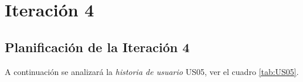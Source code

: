\section{Iteración 4}
\label{sec:iteracion_4}

%
%
%
%
%

\subsection{Planificación de la Iteración 4}

%



A continuación se analizará la \emph{historia de usuario} US05, ver el cuadro \ref{tab:US05}.

